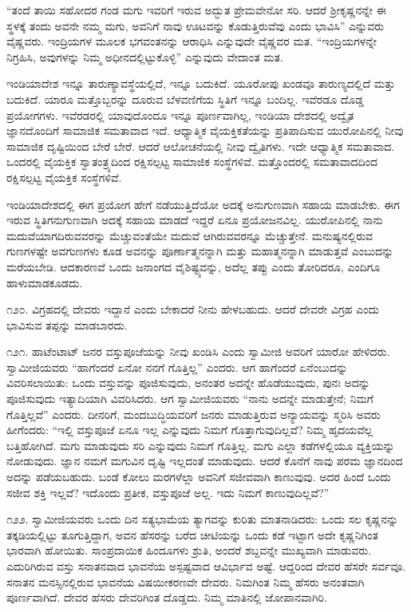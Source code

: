 “ತಂದೆ ತಾಯಿ ಸಹೋದರ ಗಂಡ ಮಗು ಇವರಿಗೆ ಇರುವ ಅದ್ಭುತ ಪ್ರೇಮವೇನೋ ಸರಿ. ಆದರೆ ಶ‍್ರೀಕೃಷ್ಣನನ್ನೇ ಈ ಸ್ಥಳಕ್ಕೆ ತಂದು ಅವನೇ ನಮ್ಮ ಮಗು, ಅವನಿಗೆ ನಾವು ಊಟವನ್ನು ಕೊಡುತ್ತಿರುವೆವು ಎಂದು ಭಾವಿಸಿ” ಎನ್ನುವರು ವೈಷ್ಣವರು. ಇಂದ್ರಿಯಗಳ ಮೂಲಕ ಭಗವಂತನನ್ನು ಆರಾಧಿಸಿ ಎನ್ನುವುದೇ ವೈಷ್ಣವರ ಮತ. “ಇಂದ್ರಿಯಗಳನ್ನೇ ನಿಗ್ರಹಿಸಿ, ಅವುಗಳನ್ನು ನಿಮ್ಮ ಅಧೀನದಲ್ಲಿಟ್ಟುಕೊಳ್ಳಿ” ಎನ್ನುವುದು ವೇದಾಂತ ಮತ.

ಇಂಡಿಯಾದೇಶ ಇನ್ನೂ ತಾರುಣ್ಯಾವಸ್ಥೆಯಲ್ಲಿದೆ, ಇನ್ನೂ ಬದುಕಿದೆ. ಯೂರೋಪು ಖಂಡವೂ ತಾರುಣ್ಯದಲ್ಲಿದೆ ಮತ್ತು ಬದುಕಿದೆ. ಯಾರೂ ಮತ್ತೊಬ್ಬರನ್ನು ದೂರುವ ಬೆಳವಣಿಗೆಯ ಸ್ಥಿತಿಗೆ ಇನ್ನೂ ಬಂದಿಲ್ಲ. ಇವೆರಡೂ ದೊಡ್ಡ ಪ್ರಯೋಗಗಳು. ಇವೆರಡರಲ್ಲಿ ಯಾವುದೊಂದೂ ಇನ್ನೂ ಪೂರ್ಣವಾಗಿಲ್ಲ, ಇಂಡಿಯಾ ದೇಶದಲ್ಲಿ ಅದ್ವೈತ ಜ್ಞಾನದೊಂದಿಗೆ ಸಾಮಾಜಿಕ ಸಮತಾವಾದ ಇದೆ. ಆಧ್ಯಾತ್ಮಿಕ ವೈಯಕ್ತಿಕತೆಯನ್ನು ಪ್ರತಿಪಾದಿಸುವ ಯುರೋಪಿನಲ್ಲಿ ನೀವು ಸಾಮಾಜಿಕ ದೃಷ್ಟಿಯಿಂದ ಬೇರೆ ಬೇರೆ. ಆದರೆ ಆಲೋಚನೆಯಲ್ಲಿ ನೀವು ದ್ವೈತಿಗಳು. ಇದೇ ಆಧ್ಯಾತ್ಮಿಕ ಸಮತಾವಾದ. ಒಂದರಲ್ಲಿ ವೈಯಕ್ತಿಕ ಸ್ವಾತಂತ್ರ್ಯದಿಂದ ರಕ್ಷಿಸಲ್ಪಟ್ಟ ಸಾಮಾಜಿಕ ಸಂಸ್ಥೆಗಳಿವೆ. ಮತ್ತೊಂದರಲ್ಲಿ ಸಮತಾವಾದದಿಂದ ರಕ್ಷಿಸಲ್ಪಟ್ಟ ವೈಯಕ್ತಿಕ ಸಂಸ್ಥೆಗಳಿವೆ.

ಇಂಡಿಯಾದೇಶದಲ್ಲಿ ಈಗ ಪ್ರಯೋಗ ಹೇಗೆ ನಡೆಯುತ್ತಿದೆಯೋ ಅದಕ್ಕೆ ಅನುಗುಣವಾಗಿ ಸಹಾಯ ಮಾಡಬೇಕು. ಈಗ ಇರುವ ಸ್ಥಿತಿಗನುಗುಣವಾಗಿ ಅದಕ್ಕೆ ಸಹಾಯ ಮಾಡದೆ ಇದ್ದರೆ ಏನೂ ಪ್ರಯೋಜನವಿಲ್ಲ. ಯುರೋಪಿನಲ್ಲಿ ನಾನು ಮದುವೆಯಾಗದಿರುವವರನ್ನು ಮೆಚ್ಚುವಂತೆಯೇ ಮದುವೆ ಆಗಿರುವವರನ್ನೂ ಮೆಚ್ಚುತ್ತೇನೆ. ಮನುಷ್ಯನಲ್ಲಿರುವ ಗುಣಗಳಷ್ಟೇ ಅವಗುಣಗಳು ಕೂಡ ಅವನನ್ನು ಪೂರ್ಣಾತ್ಮನನ್ನಾಗಿ ಮತ್ತು ಮಹಾತ್ಮನನ್ನಾಗಿ ಮಾಡುತ್ತವೆ ಎಂಬುದನ್ನು ಮರೆಯಬೇಡಿ. ಆದಕಾರಣವೆ ಒಂದು ಜನಾಂಗದ ವೈಶಿಷ್ಟ್ಯವನ್ನು, ಅದೆಲ್ಲ ತಪ್ಪು ಎಂದು ತೋರಿದರೂ, ಎಂದಿಗೂ ಹಾಳುಮಾಡಕೂಡದು.

೧೨೦. ವಿಗ್ರಹದಲ್ಲಿ ದೇವರು ಇದ್ದಾನೆ ಎಂದು ಬೇಕಾದರೆ ನೀನು ಹೇಳಬಹುದು. ಆದರೆ ದೇವರೇ ವಿಗ್ರಹ ಎಂದು ಭಾವಿಸುವ ತಪ್ಪನ್ನು ಮಾಡಬಾರದು.

೧೨೧. ಹಾಟೆಂಟಾಟ್ ಜನರ ವಸ್ತುಪೂಜೆಯನ್ನು ನೀವು ಖಂಡಿಸಿ ಎಂದು ಸ್ವಾಮೀಜಿ ಅವರಿಗೆ ಯಾರೋ ಹೇಳಿದರು. ಸ್ವಾಮೀಜಿಯವರು “ಹಾಗೆಂದರೆ ಏನೋ ನನಗೆ ಗೊತ್ತಿಲ್ಲ” ಎಂದರು. ಆಗ ಹಾಗೆಂದರೆ ಏನೆಂಬುದನ್ನು ವಿವರಿಸಲಾಯಿತು: ಒಂದು ವಸ್ತುವನ್ನು ಪೂಜಿಸುವುದು, ಅನಂತರ ಅದನ್ನೇ ಹೊಡೆಯುವುದು, ಪುನಃ ಅದನ್ನು ಪೂಜಿಸುವುದು ಇತ್ಯಾದಿಯಾಗಿ ವಿವರಿಸಿದರು. ಆಗ ಸ್ವಾಮೀಜಿಯವರು “ನಾನು ಅದನ್ನೇ ಮಾಡುತ್ತೇನೆ; ನಿಮಗೆ ಗೊತ್ತಿಲ್ಲವೆ” ಎಂದರು. ದೀನರಿಗೆ, ಮಂದಬುದ್ಧಿಯವರಿಗೆ ಜನರು ಮಾಡುತ್ತಿರುವ ಅನ್ಯಾಯವನ್ನು ಸ್ಮರಿಸಿ ಅವರು ಹೀಗೆಂದರು: “ಇಲ್ಲಿ ವಸ್ತುಪೂಜೆ ಏನೂ ಇಲ್ಲ ಎನ್ನುವುದು ನಿಮಗೆ ಗೊತ್ತಾಗುವುದಿಲ್ಲವೆ? ನಿಮ್ಮ ಹೃದಯವೆಲ್ಲ ಬತ್ತಿಹೋಗಿದೆ. ಮಗು ಮಾಡುವುದು ಸರಿ ಎನ್ನುವುದು ನಿಮಗೆ ಗೊತ್ತಿಲ್ಲ. ಮಗು ಎಲ್ಲಾ ಕಡೆಗಳಲ್ಲಿಯೂ ವ್ಯಕ್ತಿಯನ್ನು ನೋಡುವುದು. ಜ್ಞಾನ ನಮಗೆ ಮಗುವಿನ ದೃಷ್ಟಿ ಇಲ್ಲದಂತೆ ಮಾಡುವುದು. ಆದರೆ ಕೊನೆಗೆ ನಾವು ಪರಮ ಜ್ಞಾನದಿಂದ ಅದನ್ನು ಪಡೆಯಬಹುದು. ಬಂಡೆ ಕೋಲು ಮರಗಳೆಲ್ಲಾ ಅವನಿಗೆ ಸಜೀವವಾಗಿ ಕಾಣುವುವು. ಅದರ ಹಿಂದೆ ಒಂದು ಸಜೀವ ಶಕ್ತಿ ಇಲ್ಲವೆ? ಇದೊಂದು ಪ್ರತೀಕ, ವಸ್ತುಪೂಜೆ ಅಲ್ಲ. ಇದು ನಿಮಗೆ ಕಾಣುವುದಿಲ್ಲವೆ?”

೧೨೨. ಸ್ವಾಮೀಜಿಯವರು ಒಂದು ದಿನ ಸತ್ಯಭಾಮೆಯ ತ್ಯಾಗವನ್ನು ಕುರಿತು ಮಾತನಾಡಿದರು: ಒಂದು ಸಲ ಕೃಷ್ಣನನ್ನು ತಕ್ಕಡಿಯಲ್ಲಿಟ್ಟು ತೂಗುತ್ತಿದ್ದಾಗ, ಅವನ ಹೆಸರನ್ನು ಬರೆದ ಚೀಟಿಯನ್ನು ಒಂದು ಕಡೆ ಇಟ್ಟಾಗ ಅದೇ ಕೃಷ್ಣನಿಗಿಂತ ಭಾರವಾಗಿ ಹೋಯಿತು. ಸಾಂಪ್ರದಾಯಿಕ ಹಿಂದೂಗಳು ಶ್ರುತಿ, ಅಂದರೆ ಶಬ್ದವನ್ನೇ ಮುಖ್ಯವಾಗಿ ಮಾಡುವರು. ಎದುರಿಗಿರುವ ವಸ್ತು ಸನಾತನವಾದ ಭಾವನೆಯ ಅಸ್ಪಷ್ಟವಾದ ಆವಿರ್ಭಾವ ಅಷ್ಟೆ. ಆದ್ದರಿಂದ ದೇವರ ಹೆಸರೇ ಸರ್ವವೂ. ಸನಾತನ ಮನಸ್ಸಿನಲ್ಲಿರುವ ಭಾವನೆಯ ವಿಷಯೀಕರಣವೇ ದೇವರು. ನಿಮಗಿಂತ ನಿಮ್ಮ ಹೆಸರು ಅನಂತವಾಗಿ ಪೂರ್ಣವಾಗಿದೆ. ದೇವರ ಹೆಸರು ದೇವರಿಗಿಂತ ದೊಡ್ಡದು. ನಿಮ್ಮ ಮಾತಿನಲ್ಲಿ ಜೋಪಾನವಾಗಿರಿ.

